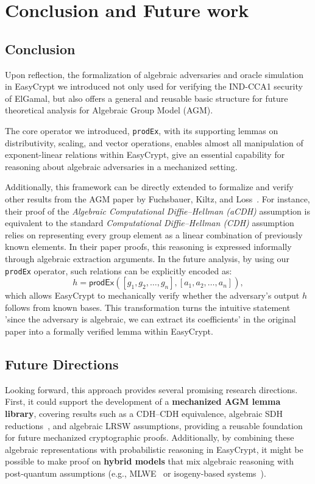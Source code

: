 \chapter{Conclusion and Future work}\label{chap:conclusion}


\section{Conclusion}
\label{sec:conclusion}

Upon reflection, the formalization of algebraic adversaries and oracle simulation in EasyCrypt we introduced 
not only used for verifying the IND-CCA1 security of ElGamal, but also offers a general and reusable basic structure for future theoretical analysis for Algebraic Group Model (AGM). 

The core operator we introduced, \texttt{prodEx}, with its supporting lemmas on distributivity, scaling, and vector operations, enables almost all manipulation of exponent-linear relations within EasyCrypt, give an essential capability for reasoning about algebraic adversaries in a mechanized setting.

Additionally, this framework can be directly extended to formalize and verify other results from the AGM paper by Fuchsbauer, Kiltz, and Loss~\cite{fuchsbauer2018}. 
For instance, their proof of the \emph{Algebraic Computational Diffie--Hellman (aCDH)} assumption is equivalent to the standard \emph{Computational Diffie--Hellman (CDH)} assumption relies on representing every group element as a linear combination of previously known elements. 
In their paper proofs, this reasoning is expressed informally through algebraic extraction arguments. 
In the future analysis, by using our \texttt{prodEx} operator, such relations can be explicitly encoded as:
\[
h = \mathsf{prodEx}([g_1, g_2, \ldots, g_n], [a_1, a_2, \ldots, a_n]),
\]
which allows EasyCrypt to mechanically verify whether the adversary’s output \(h\) follows from known bases. 
This transformation turns the intuitive statement 'since the adversary is algebraic, we can extract its coefficients' in the original paper into a formally verified lemma within EasyCrypt.




\section{Future Directions}
\label{sec:future}
Looking forward, this approach provides several promising research directions. 
First, it could support the development of a \textbf{mechanized AGM lemma library}, covering results such as a CDH--CDH equivalence, algebraic SDH reductions~\cite{sdh2020}, and algebraic LRSW assumptions, providing a reusable foundation for future mechanized cryptographic proofs. Additionally, by combining these algebraic representations with probabilistic reasoning in EasyCrypt, it might be possible to make proof on \textbf{hybrid models} that mix algebraic reasoning with post-quantum assumptions (e.g., MLWE~\cite{nguyen2022} or isogeny-based systems~\cite{de2017}). 


